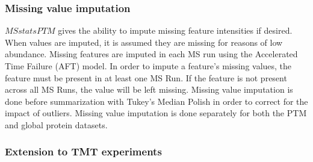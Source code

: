 \documentclass[mcp]{article}
\numberwithin{figure}{section} %
\numberwithin{table}{section}
\begin{document}

\subsubsection*{Missing value imputation}
\label{sec:missing_imp}

$MSstatsPTM$ gives the ability to impute missing feature intensities if desired. When values are imputed, it is assumed they are missing for reasons of low abundance. Missing features are imputed in each MS run using the Accelerated Time Failure (AFT) model.\cite{Tukey:1977} In order to impute a feature's missing values, the feature must be present in at least one MS Run. If the feature is not present across all MS Runs, the value will be left missing. Missing value imputation is done before summarization with Tukey's Median Polish in order to correct for the impact of outliers. Missing value imputation is done separately for both the PTM and global protein datasets.

\subsubsection*{Extension to TMT experiments}
\end{document}
